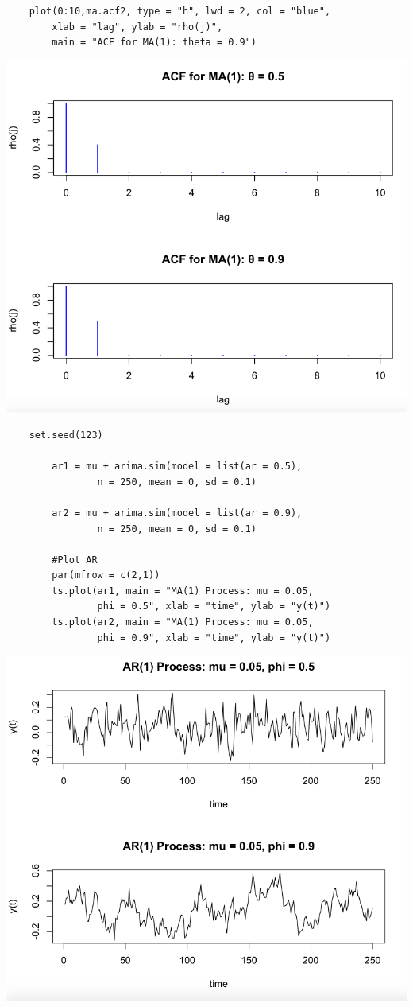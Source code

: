 \documentclass[letterpaper,12pt]{article}
\begin{document}
\begin{enumerate}
\begin{lstlisting}
	plot(0:10,ma.acf2, type = "h", lwd = 2, col = "blue", 
		xlab = "lag", ylab = "rho(j)", 
		main = "ACF for MA(1): theta = 0.9")	
	\end{lstlisting}    

\includegraphics[scale = 0.5]{MACF1}

	\begin{lstlisting}
	set.seed(123)

        ar1 = mu + arima.sim(model = list(ar = 0.5),
                n = 250, mean = 0, sd = 0.1)
        
        ar2 = mu + arima.sim(model = list(ar = 0.9), 
                n = 250, mean = 0, sd = 0.1)
        
        #Plot AR
        par(mfrow = c(2,1))
        ts.plot(ar1, main = "MA(1) Process: mu = 0.05, 
                phi = 0.5", xlab = "time", ylab = "y(t)")
        ts.plot(ar2, main = "MA(1) Process: mu = 0.05, 
                phi = 0.9", xlab = "time", ylab = "y(t)")        		
	\end{lstlisting} 

\includegraphics[scale =0.5]{AR1}


\end{enumerate}
\end{document}
